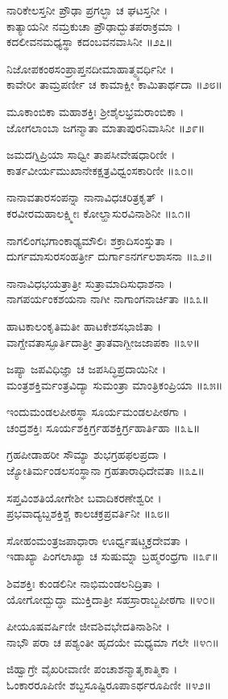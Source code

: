 ನಾರಿಕೇಲಸ್ತನೀ ಪ್ರೌಢಾ ಪ್ರಗಲ್ಭಾ ಚ ಘಟಸ್ತನೀ ।\\
ಕಾತ್ಯಾಯನೀ ನಮ್ರಕುಚಾ ಪ್ರೌಢಾದ್ಭುತಪರಾಕ್ರಮಾ ।\\
ಕದಲೀವನಮಧ್ಯಸ್ಥಾ ಕದಂಬವನವಾಸಿನೀ ॥೨೭॥

ನಿಜೋಪಕಂಠಸಂಪ್ರಾಪ್ತನದೀಮಾಹಾತ್ಮ್ಯವರ್ಧಿನೀ ।\\
ಕಾವೇರೀ ತಾಮ್ರಪರ್ಣೀ ಚ ಕಾಮಾಕ್ಷೀ ಕಾಮಿತಾರ್ಥದಾ ॥೨೮॥

ಮೂಕಾಂಬಿಕಾ ಮಹಾಶಕ್ತಿಃ ಶ್ರೀಶೈಲಭ್ರಮರಾಂಬಿಕಾ ।\\
ಜೋಗಲಾಂಬಾ ಜಗನ್ಮಾತಾ ಮಾತಾಪುರನಿವಾಸಿನೀ ॥೨೯॥

ಜಮದಗ್ನಿಪ್ರಿಯಾ ಸಾಧ್ವೀ ತಾಪಸೀವೇಷಧಾರಿಣೀ ।\\
ಕಾರ್ತವೀರ್ಯಮುಖಾನೇಕಕ್ಷತ್ರವಿಧ್ವಂಸಕಾರಿಣೀ ॥೩೦॥

ನಾನಾವತಾರಸಂಪನ್ನಾ ನಾನಾವಿಧಚರಿತ್ರಕೃತ್ ।\\
ಕರವೀರಮಹಾಲಕ್ಷ್ಮೀಃ ಕೋಲ್ಹಾಸುರವಿನಾಶಿನೀ ॥೩೧॥

ನಾಗಲಿಂಗಭಗಾಂಕಾಢ್ಯಮೌಲಿಃ ಶಕ್ರಾದಿಸಂಸ್ತುತಾ ।\\
ದುರ್ಗಮಾಸುರಸಂಹರ್ತ್ರೀ ದುರ್ಗಾಽನರ್ಗಲಶಾಸನಾ ॥೩೨॥

ನಾನಾವಿಧಭಯತ್ರಾತ್ರೀ ಸುತ್ರಾಮಾದಿಸುಧಾಶನಾ ।\\
ನಾಗಪರ್ಯಂಕಶಯನಾ ನಾಗೀ ನಾಗಾಂಗನಾರ್ಚಿತಾ ॥೩೩॥

ಹಾಟಕಾಲಂಕೃತಿಮತೀ ಹಾಟಕೇಶಸಭಾಜಿತಾ ।\\
ವಾಗ್ದೇವತಾಸ್ಫೂರ್ತಿದಾತ್ರೀ ತ್ರಾತವಾಗ್ಬೀಜಜಾಪಕಾ ॥೩೪॥

ಜಪ್ಯಾ ಜಪವಿಧಿಜ್ಞಾ ಚ ಜಪಸಿದ್ಧಿಪ್ರದಾಯಿನೀ ।\\
ಮಂತ್ರಶಕ್ತಿರ್ಮಂತ್ರವಿದ್ಯಾ ಸುಮಂತ್ರಾ ಮಾಂತ್ರಿಕಂಪ್ರಿಯಾ ॥೩೫॥

ಇಂದುಮಂಡಲಪೀಠಸ್ಥಾ ಸೂರ್ಯಮಂಡಲಪೀಠಗಾ ।\\
ಚಂದ್ರಶಕ್ತಿಃ ಸೂರ್ಯಶಕ್ತಿರ್ಗ್ರಹಶಕ್ತಿರ್ಗ್ರಹಾರ್ತಿಹಾ ॥೩೬॥

ಗ್ರಹಪೀಡಾಹರೀ ಸೌಮ್ಯಾ ಶುಭಗ್ರಹಫಲಪ್ರದಾ ।\\
ಜ್ಯೋತಿರ್ಮಂಡಲಸಂಸ್ಥಾನಾ ಗ್ರಹತಾರಾಧಿದೇವತಾ ॥೩೭॥

ಸಪ್ತವಿಂಶತಿಯೋಗೇಶೀ ಬವಾದಿಕರಣೇಶ್ವರೀ ।\\
ಪ್ರಭವಾದ್ಯಬ್ದಶಕ್ತಿಶ್ಚ ಕಾಲಚಕ್ರಪ್ರವರ್ತಿನೀ ॥೩೮॥

ಸೋಹಂಮಂತ್ರಜಪಾಧಾರಾ ಊರ್ಧ್ವಷಟ್ಚಕ್ರದೇವತಾ ।\\
ಇಡಾಖ್ಯಾ ಪಿಂಗಲಾಖ್ಯಾ ಚ ಸುಷುಮ್ನಾ ಬ್ರಹ್ಮರಂಧ್ರಗಾ ॥೩೯॥

ಶಿವಶಕ್ತಿಃ ಕುಂಡಲಿನೀ ನಾಭಿಮಂಡಲನಿದ್ರಿತಾ ।\\
ಯೋಗೋದ್ಬುದ್ಧಾ ಮುಕ್ತಿದಾತ್ರೀ ಸಹಸ್ರಾರಾಬ್ಜಪೀಠಗಾ ॥೪೦॥

ಪೀಯೂಷವರ್ಷಿಣೀ ಜೀವಶಿವಭೇದತಿನಾಶಿನೀ ।\\
ನಾಭೌ ಪರಾ ಚ ಪಶ್ಯಂತೀ ಹೃದಯೇ ಮಧ್ಯಮಾ ಗಲೇ ॥೪೧॥

ಜಿಹ್ವಾಗ್ರೇ ವೈಖರೀವಾಣೀ ಪಂಚಾಶನ್ಮಾತೃಕಾತ್ಮಿಕಾ ।\\
ಓಂಕಾರರೂಪಿಣೀ ಶಬ್ದಸೂಷ್ಟಿರೂಪಾಽರ್ಥರೂಪಿಣೀ ॥೪೨॥

